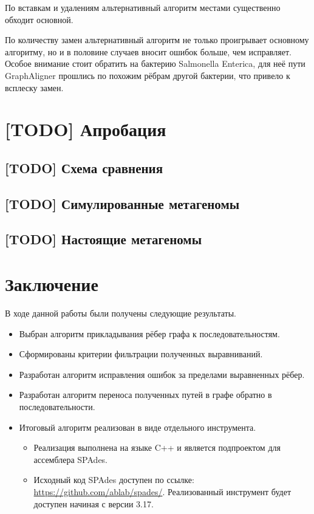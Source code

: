 \documentclass[14pt]{matmex-diploma-custom}
\begin{document}
По вставкам и удалениям альтернативный алгоритм местами существенно обходит основной.

По количеству замен альтернативный алгоритм не только проигрывает основному алгоритму, но и в половине случаев вносит ошибок больше, чем исправляет. Особое внимание стоит обратить на бактерию Salmonella Enterica, для неё пути GraphAligner прошлись по похожим рёбрам другой бактерии, что привело к всплеску замен.


\section{[TODO] Апробация}
\subsection{[TODO] Схема сравнения}
\subsection{[TODO] Симулированные метагеномы}
\subsection{[TODO] Настоящие метагеномы}

\newpage
\section*{Заключение}
В ходе данной работы были получены следующие результаты.
\begin{itemize}
    \item Выбран алгоритм прикладывания рёбер графа к последовательностям.
    \item Сформированы критерии фильтрации полученных выравниваний.
    \item Разработан алгоритм исправления ошибок за пределами выравненных рёбер.
    \item Разработан алгоритм переноса полученных путей в графе обратно в последовательности.
    \item Итоговый алгоритм реализован в виде отдельного инструмента.
    \begin{itemize}
        \item Реализация выполнена на языке C++ и является подпроектом для ассемблера SPAdes.
        \item \begin{sloppypar} Исходный код SPAdes доступен по ссылке: \mbox{\url{https://github.com/ablab/spades/}}. Реализованный инструмент будет доступен начиная с версии 3.17. \end{sloppypar}
    \end{itemize}
\end{itemize}
\end{document}
